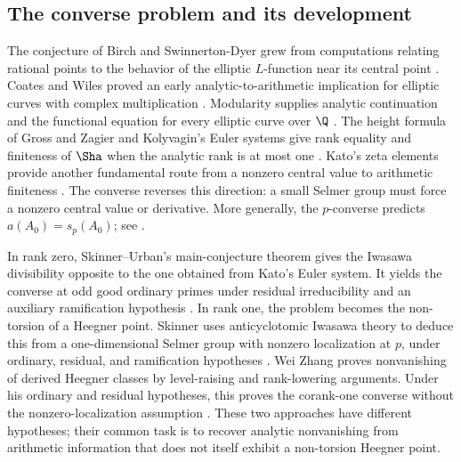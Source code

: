 \subsection{The converse problem and its development}

The conjecture of Birch and Swinnerton-Dyer grew from computations
relating rational points to the behavior of the elliptic $L$-function
near its central point \citep{BirchSwinnertonDyer1965}.
Coates and Wiles proved an early analytic-to-arithmetic implication for
elliptic curves with complex multiplication \citep{CoatesWiles1977}.
Modularity supplies analytic continuation and the functional equation
for every elliptic curve over $\Q$ \citep{BCDT2001}. The height formula
of Gross and Zagier and Kolyvagin's Euler systems give rank equality
and finiteness of $\Sha$ when the analytic rank is at most one
\citep{GrossZagier1986,Kolyvagin1990}. Kato's zeta elements provide
another fundamental route from a nonzero central value to arithmetic
finiteness \citep{Kato2004}.
The converse reverses this direction: a small Selmer group must force
a nonzero central value or derivative. More generally, the
$p$-converse predicts $a(A_0)=s_p(A_0)$; see
\citet[Conjecture~A]{KellerYin2024}.

In rank zero, Skinner--Urban's main-conjecture theorem gives the
Iwasawa divisibility opposite to the one obtained from Kato's Euler
system. It yields the converse at odd good ordinary primes under
residual irreducibility and an auxiliary ramification hypothesis
\citep{SkinnerUrban2014}.
In rank one, the problem becomes the non-torsion of a Heegner point.
Skinner uses anticyclotomic Iwasawa theory to deduce this from a
one-dimensional Selmer group with nonzero localization at $p$, under
ordinary, residual, and ramification hypotheses
\citep[Theorem~B]{Skinner2020}.
Wei Zhang proves nonvanishing of derived Heegner classes by
level-raising and rank-lowering arguments. Under his ordinary and
residual hypotheses, this proves the corank-one converse without the
nonzero-localization assumption \citep[Theorem~1.4]{Zhang2014}.
These two approaches have different hypotheses; their common task is
to recover analytic nonvanishing from arithmetic information that
does not itself exhibit a non-torsion Heegner point.

